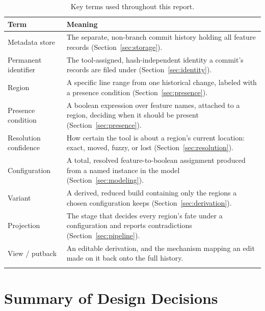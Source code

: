 \documentclass[11pt]{article}
\begin{document}
\begin{longtable}{@{}p{}p{}@{}}
\toprule
\textbf{Term} & \textbf{Meaning} \\
\midrule
\endhead
Metadata store & The separate, non-branch commit history holding all
  feature records (Section~\ref{sec:storage}). \\
Permanent identifier & The tool-assigned, hash-independent identity a
  commit's records are filed under (Section~\ref{sec:identity}). \\
Region & A specific line range from one historical change, labeled with a
  presence condition (Section~\ref{sec:presence}). \\
Presence condition & A boolean expression over feature names, attached to
  a region, deciding when it should be present (Section~\ref{sec:presence}). \\
Resolution confidence & How certain the tool is about a region's current
  location: exact, moved, fuzzy, or lost (Section~\ref{sec:resolution}). \\
Configuration & A total, resolved feature-to-boolean assignment produced
  from a named instance in the model (Section~\ref{sec:modeling}). \\
Variant & A derived, reduced build containing only the regions a chosen
  configuration keeps (Section~\ref{sec:derivation}). \\
Projection & The stage that decides every region's fate under a
  configuration and reports contradictions (Section~\ref{sec:pipeline}). \\
View / putback & An editable derivation, and the mechanism mapping an
  edit made on it back onto the full history. \\
\bottomrule
\caption{Key terms used throughout this report.}
\label{tab:concepts}
\end{longtable}

\section{Summary of Design Decisions}
\end{document}
